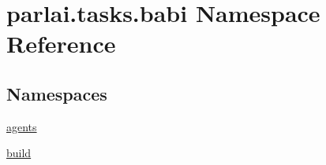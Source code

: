 \hypertarget{namespaceparlai_1_1tasks_1_1babi}{}\section{parlai.\+tasks.\+babi Namespace Reference}
\label{namespaceparlai_1_1tasks_1_1babi}
\subsection*{Namespaces}
\begin{DoxyCompactItemize}
\item 
 \hyperlink{namespaceparlai_1_1tasks_1_1babi_1_1agents}{agents}
\item 
 \hyperlink{namespaceparlai_1_1tasks_1_1babi_1_1build}{build}
\end{DoxyCompactItemize}
